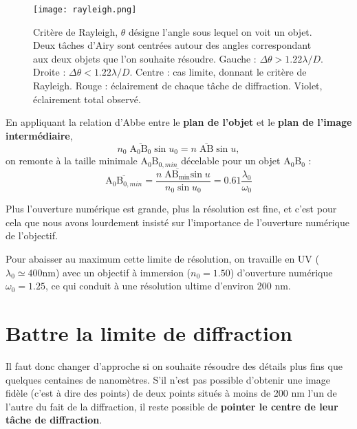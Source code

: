 \documentclass[11pt,a4paper]{report}
\begin{document}
\begin{figure}[h!]
	\begin{center}
   		\texttt{[image: rayleigh.png]}\\
	\end{center}
	\caption{Critère de Rayleigh, $\theta$ désigne l'angle sous lequel on voit un objet. Deux tâches 		d'Airy sont centrées autour des angles correspondant aux deux objets que l'on souhaite résoudre. 		Gauche : $\Delta \theta > 1.22\lambda/D$. Droite :  $\Delta \theta < 1.22\lambda/D$. Centre : cas 	limite, donnant le critère de Rayleigh. Rouge : éclairement de chaque tâche de diffraction. 			Violet, éclairement total observé.}
\end{figure}

En appliquant la relation d'Abbe entre le \textbf{plan de l'objet} et le \textbf{plan de l'image intermédiaire},
\begin{equation}
	n_0\;\overline{\text{A}_0\text{B}_0}\;\text{sin}\;u_0 
	= n\;\overline{\text{A}\text{B}}\;\text{sin}\;u,
\end{equation}
on remonte à la taille minimale $\text{A}_0\text{B}_{0,min}$ décelable pour un objet 
$\text{A}_0\text{B}_0$ :
\begin{equation}
	\overline{\text{A}_0\text{B}_{0,min}}
	=\frac{n\;\overline{\text{A}\text{B}_\text{min}}\text{sin}\;u}{n_0\;\text{sin}\;u_0}
	= 0.61 \frac{\lambda_0}{\omega_0}
\end{equation}

Plus l'ouverture numérique est grande, plus la résolution est fine, et c'est pour cela que nous avons lourdement insisté sur l'importance de l'ouverture numérique de l'objectif.

Pour abaisser au maximum cette limite de résolution, on travaille en UV ($\lambda_0 \simeq 400$nm) avec un objectif à immersion ($n_0 = 1.50$) d'ouverture numérique $\omega_0 = 1.25$, ce qui conduit à une résolution ultime d'environ 200 nm.

\newpage
\section{Battre la limite de diffraction}

Il faut donc changer d'approche si on souhaite résoudre des détails plus fins que quelques centaines de nanomètres. S'il n'est pas possible d'obtenir une image fidèle (c'est à dire des points) de deux points situés à moins de 200 nm l'un de l'autre du fait de la diffraction, il reste possible de \textbf{pointer le centre de leur tâche de diffraction}.\\
\end{document}
